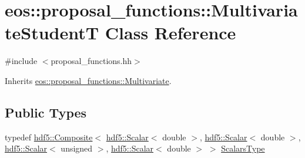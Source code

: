 \hypertarget{classeos_1_1proposal__functions_1_1MultivariateStudentT}{
\section{eos::proposal\_\-functions::MultivariateStudentT Class Reference}
\label{classeos_1_1proposal__functions_1_1MultivariateStudentT}
}


{\ttfamily \#include $<$proposal\_\-functions.hh$>$}

Inherits \hyperlink{classeos_1_1proposal__functions_1_1Multivariate}{eos::proposal\_\-functions::Multivariate}.\subsection*{Public Types}
\begin{DoxyCompactItemize}
\item 
typedef \hyperlink{classeos_1_1hdf5_1_1Composite}{hdf5::Composite}$<$ \hyperlink{classeos_1_1hdf5_1_1Scalar}{hdf5::Scalar}$<$ double $>$, \hyperlink{classeos_1_1hdf5_1_1Scalar}{hdf5::Scalar}$<$ double $>$, \hyperlink{classeos_1_1hdf5_1_1Scalar}{hdf5::Scalar}$<$ unsigned $>$, \hyperlink{classeos_1_1hdf5_1_1Scalar}{hdf5::Scalar}$<$ double $>$ $>$ \hyperlink{classeos_1_1proposal__functions_1_1MultivariateStudentT_aab40ca04073f1bfec9378681526aadd8}{ScalarsType}
\end{DoxyCompactItemize}
